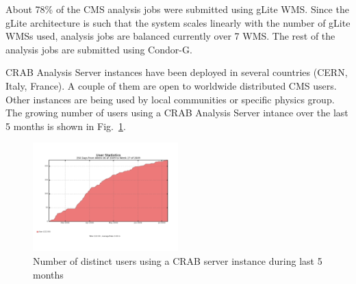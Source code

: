 About 78\% of the CMS analysis jobs were submitted using gLite WMS.  Since the gLite architecture is such that the system scales linearly with the number of gLite WMSs used, analysis jobs are balanced currently over 7 WMS. The rest of the analysis jobs are submitted using Condor-G.

CRAB Analysis Server instances have been deployed in several countries (CERN, Italy, France). A couple of them are open to worldwide distributed CMS users. Other instances are being used by local communities or specific physics group.
The growing number of users using a CRAB Analysis Server intance over the last 5 months is shown in Fig.~\ref{fig:CSusers}.
\begin{figure}
\includegraphics[width=0.5\textwidth]{figures/CSusersLast5months.png}
\caption{Number of distinct users using a CRAB server instance during last 5 months}
\label{fig:CSusers}
\end{figure}

